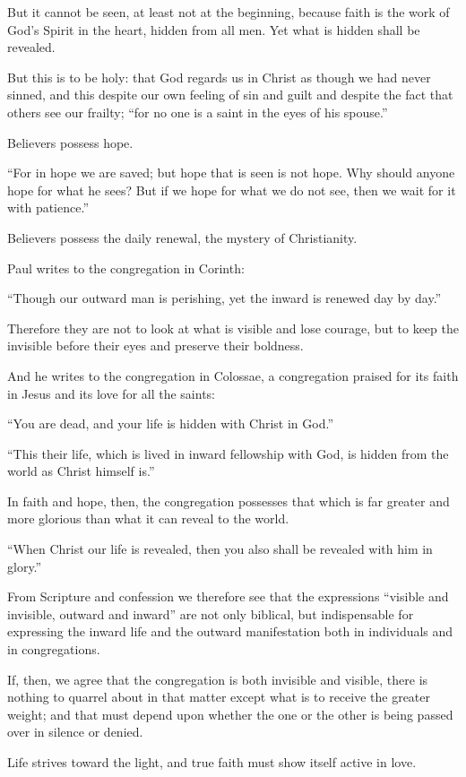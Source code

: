 But it cannot be seen, at least not at the beginning, because faith is the work of God’s Spirit in the heart, hidden from all men. Yet what is hidden shall be revealed.

But this is to be holy: that God regards us in Christ as though we had never sinned, and this despite our own feeling of sin and guilt and despite the fact that others see our frailty; “for no one is a saint in the eyes of his spouse.”

Believers possess hope.

“For in hope we are saved; but hope that is seen is not hope. Why should anyone hope for what he sees? But if we hope for what we do not see, then we wait for it with patience.”

Believers possess the daily renewal, the mystery of Christianity.

Paul writes to the congregation in Corinth:

“Though our outward man is perishing, yet the inward is renewed day by day.”

Therefore they are not to look at what is visible and lose courage, but to keep the invisible before their eyes and preserve their boldness.

And he writes to the congregation in Colossae, a congregation praised for its faith in Jesus and its love for all the saints:

“You are dead, and your life is hidden with Christ in God.”

“This their life, which is lived in inward fellowship with God, is hidden from the world as Christ himself is.”

In faith and hope, then, the congregation possesses that which is far greater and more glorious than what it can reveal to the world.

“When Christ our life is revealed, then you also shall be revealed with him in glory.”

From Scripture and confession we therefore see that the expressions “visible and invisible, outward and inward” are not only biblical, but indispensable for expressing the inward life and the outward manifestation both in individuals and in congregations.

If, then, we agree that the congregation is both invisible and visible, there is nothing to quarrel about in that matter except what is to receive the greater weight; and that must depend upon whether the one or the other is being passed over in silence or denied.

Life strives toward the light, and true faith must show itself active in love.

